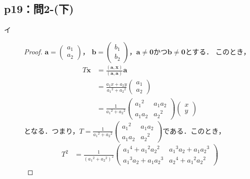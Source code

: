 \documentclass[uplatex,dvipdfmx,a4paper,10pt,fleqn]{jsarticle}
\begin{document}
\subsection*{p19：問2-(下)}
\begin{leftbar}
\begin{description}
    \item[イ] 
    \begin{proof}
    $\bm{a}=
        \begin{pmatrix}
            a_1 \\
            a_2
        \end{pmatrix}
    $，
    $\bm{b}=
        \begin{pmatrix}
            b_1 \\
            b_2
        \end{pmatrix}
    $，$\bm{a} \ne \bm{0}$かつ$\bm{b} \ne \bm{0}$とする．
    このとき，
    \begin{align*}
        T \bm{x} &=\frac{(\bm{a},\bm{x})}{(\bm{a},\bm{a})} \bm{a} \\
        & = \frac{a_1 x + a_2 y}{{a_1}^2+{a_2}^2} 
        \begin{pmatrix}
            a_1 \\
            a_2
        \end{pmatrix}
        \\
        & =
        \frac{1}{{a_1}^2+{a_2}^2}
        \begin{pmatrix}
            {a_1}^2 & a_1 a_2 \\
            a_1 a_2 & {a_2}^2
        \end{pmatrix}
        \begin{pmatrix}
            x \\
            y
        \end{pmatrix}
    \end{align*}
    となる．つまり，$T=\frac{1}{{a_1}^2+{a_2}^2}
    \begin{pmatrix}
        {a_1}^2 & a_1 a_2 \\
        a_1 a_2 & {a_2}^2
    \end{pmatrix}
    $である．このとき，
    \begin{align*}
        T^2 &= \frac{1}{({a_1}^2+{a_2}^2)^2}
        \begin{pmatrix}
            {a_1}^4 + {a_1}^2 {a_2}^2 & {a_1}^3 a_2 + a_1 {a_2}^3 \\
            {a_1}^3 a_2 + a_1 {a_2}^3 & {a_2}^4 + {a_1}^2 {a_2}^2

\end{pmatrix}
\end{align*}
\end{proof}
\end{description}
\end{leftbar}
\end{document}
